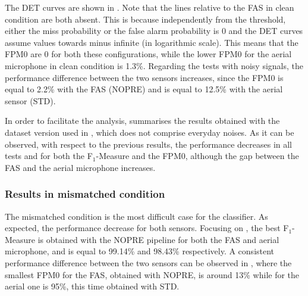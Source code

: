 The DET curves are shown in . Note that the lines relative to the FAS in clean condition are both absent. This is because independently from the threshold, either the miss probability or the false alarm probability is 0 and the DET curves assume  values towards minus infinite (in logarithmic scale). This means that the FPM0 are 0 for both these configurations, while the lower FPM0 for the aerial microphone in clean condition is 1.3\%. Regarding the tests with noisy signals, the performance difference between the two sensors increases, since the FPM0 is equal to 2.2\% with the FAS (NOPRE) and is equal to 12.5\% with the aerial sensor (STD).

In order to facilitate the analysis,  summarises the results obtained with the dataset version used in , which does not comprise everyday noises. As it can be observed, with respect to the previous results, the performance decreases in all tests and for both the F$_1$-Measure and the FPM0, although the gap between the FAS and the aerial microphone increases.

\subsubsection{Results in mismatched condition}

The mismatched condition  is the most difficult case for the classifier. As expected, the performance decrease for both sensors. Focusing on , the best F$_1$-Measure is obtained with the NOPRE pipeline for both the FAS and aerial microphone, and is equal to 99.14\% and 98.43\% respectively. A consistent performance difference between the two sensors can be observed in , where the smallest FPM0 for the FAS, obtained with NOPRE, is around 13\% while for the aerial one is 95\%, this time obtained with STD.

